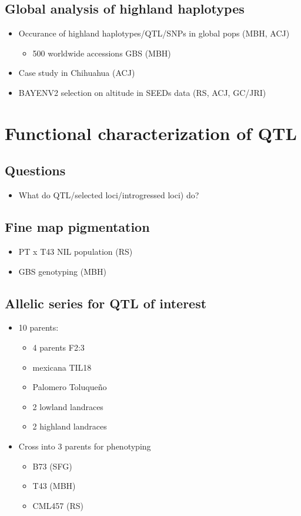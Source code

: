 \documentclass[]{article}
\begin{document}
\subsection{ Global analysis of highland haplotypes  }
	\begin{itemize}	
		\item Occurance of highland haplotypes/QTL/SNPs in global pops (MBH, ACJ)
			\begin{itemize}	
				\item 500 worldwide accessions GBS (MBH)
			\end{itemize}
		\item Case study in Chihuahua (ACJ)
		\item BAYENV2 selection on altitude in SEEDs data (RS, ACJ, GC/JRI)
	\end{itemize}

\section{ Functional characterization of QTL }
	
\subsection{ Questions } 
	\begin{itemize}
		\item What do  QTL/selected loci/introgressed loci) do?
	\end{itemize}
\subsection{ Fine map pigmentation  }
			\begin{itemize}
				\item PT x T43 NIL population (RS) 
				\item GBS genotyping (MBH)
			\end{itemize}
\subsection { Allelic series for QTL of interest }
	\begin{itemize}
		\item 10 parents:
			\begin{itemize}
			\item 4 parents F2:3
			\item mexicana TIL18
			\item Palomero Toluque\~no
			\item 2 lowland landraces
			\item 2 highland landraces
			\end{itemize}
		\item Cross into 3 parents for phenotyping
		\begin{itemize}
			\item B73 (SFG)
			\item T43 (MBH)
			\item CML457 (RS)
		\end{itemize}
	\end{itemize}
\end{document}
